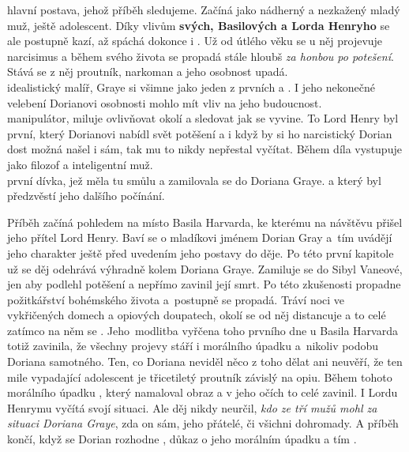 \documentclass[FGBook.tex]{subfiles}
\begin{document}
\noindent 
{} hlavní postava, jehož příběh sledujeme.
Začíná jako nádherný a nezkažený mladý muž, ještě adolescent.
Díky vlivům \textbf{svých, Basilových a Lorda Henryho} se ale postupně kazí,
až spáchá dokonce i .
Už od útlého věku se u něj projevuje narcisimus
a během svého života se propadá stále hloubš \textit{za honbou po potešení}.
Stává se z něj proutník, narkoman a jeho osobnost upadá. \\
 idealistický malíř, Graye si všimne jako jeden z prvních a .
I jeho nekonečné velebení Dorianovi osobnosti mohlo mít vliv na jeho budoucnost. \\
 manipulátor, miluje ovlivňovat okolí a sledovat jak se vyvine.
To Lord Henry byl první, který Dorianovi nabídl svět potěšení
a i když by si ho narcistický Dorian dost možná našel i sám, tak mu to nikdy nepřestal vyčítat.
Během díla vystupuje jako filozof a inteligentní muž. \\
 první dívka, jež měla tu smůlu a zamilovala se do Doriana Graye.
 a který byl předzvěstí jeho dalšího počínání.

\noindent 
Příběh začíná pohledem na místo Basila Harvarda, ke kterému na návštěvu přišel jeho přítel Lord Henry.
Baví se o mladíkovi jménem Dorian Gray
a~tím uvádějí jeho charakter ještě před uvedením jeho postavy do děje.
Po této první kapitole už se děj odehrává výhradně kolem Doriana Graye.
Zamiluje se do Sibyl Vaneové, jen aby podlehl potěšení a nepřímo zavinil její smrt.
Po této zkušenosti propadne požitkářství bohémského života a~postupně se propadá.
Tráví noci ve vykřičených domech a opiových doupatech, okolí se od něj distancuje
a to celé zatímco na něm se .
Jeho~modlitba vyřčena toho prvního dne u Basila Harvarda totiž zavinila,
že všechny projevy stáří i morálního úpadku 
a~nikoliv podobu Doriana samotného.
Ten, co Doriana neviděl něco z toho dělat ani neuvěří,
že ten mile vypadající adolescent je třicetiletý proutník závislý na opiu.
Během tohoto morálního úpadku ,
který namaloval obraz a v jeho očích to celé zavinil.
I Lordu Henrymu vyčítá svojí situaci.
Ale děj nikdy neurčil, \textit{kdo ze tří mužů mohl za situaci Doriana Graye},
zda on sám, jeho přátelé, či všichni dohromady.
A příběh končí, když se Dorian rozhodne ,
důkaz o jeho morálním úpadku a tím .
\end{document}
